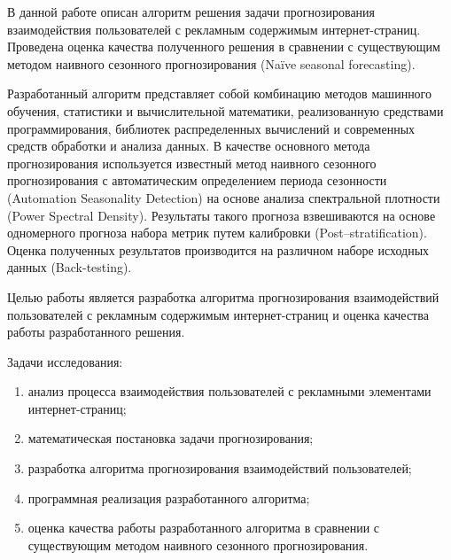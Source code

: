 В данной работе описан алгоритм решения задачи прогнозирования взаимодействия пользователей с рекламным 
содержимым интернет-страниц. Проведена оценка качества полученного решения в сравнении с существующим методом
наивного сезонного прогнозирования (Na\"{i}ve seasonal forecasting). 

Разработанный алгоритм представляет собой комбинацию методов машинного обучения, 
статистики и вычислительной математики, реализованную средствами программирования, библиотек распределенных
вычислений и современных средств обработки и анализа данных. В качестве основного метода прогнозирования 
используется известный метод наивного сезонного прогнозирования с автоматическим определением периода 
сезонности (Automation Seasonality Detection) на основе анализа спектральной плотности (Power Spectral Density).
Результаты такого прогноза взвешиваются на основе одномерного прогноза набора метрик путем калибровки
(Post--stratification). Оценка полученных результатов производится на различном наборе исходных данных (Back-testing).

Целью работы является разработка алгоритма прогнозирования взаимодействий пользователей с рекламным содержимым
интернет-страниц и оценка качества работы разработанного решения.

Задачи исследования:
\begin{enumerate}
    \item анализ процесса взаимодействия пользователей с рекламными элементами интернет-страниц;
    \item математическая постановка задачи прогнозирования;
    \item разработка алгоритма прогнозирования взаимодействий пользователей;
    \item программная реализация разработанного алгоритма;
    \item оценка качества работы разработанного алгоритма в сравнении с существующим 
    методом наивного сезонного прогнозирования.
\end{enumerate}